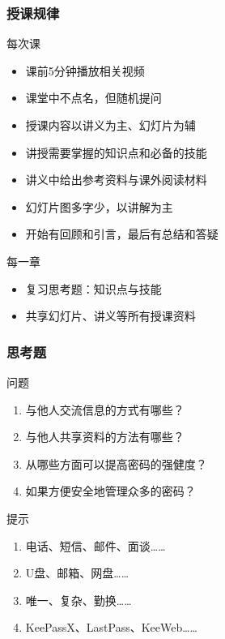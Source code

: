 \begin{frame}
  \frametitle{授课规律}
  \begin{block}{每次课}
    \begin{itemize}
      \item 课前5分钟播放相关视频
      \item 课堂中不点名，但随机提问
      \item 授课内容以讲义为主、幻灯片为辅
      \item 讲授需要掌握的知识点和必备的技能
      \item 讲义中给出参考资料与课外阅读材料
      \item 幻灯片图多字少，以讲解为主
      \item 开始有回顾和引言，最后有总结和答疑
    \end{itemize}
  \end{block}
  \pause
  \begin{block}{每一章}
    \begin{itemize}
      \item 复习思考题：知识点与技能
      \item 共享幻灯片、讲义等所有授课资料
    \end{itemize}
  \end{block}
\end{frame}

\begin{frame}
  \frametitle{思考题}
  \begin{block}{问题}
  \begin{enumerate}[<+-|alert@+>]
    \item 与他人交流信息的方式有哪些？
    \item 与他人共享资料的方法有哪些？
    \item 从哪些方面可以提高密码的强健度？
    \item 如果方便安全地管理众多的密码？
  \end{enumerate}
  \end{block}
  \pause
  \begin{block}{提示}
    \begin{enumerate}
      \item 电话、短信、邮件、面谈……
      \item U盘、邮箱、网盘……
      \item 唯一、复杂、勤换……
      \item KeePassX、LastPass、KeeWeb……
    \end{enumerate}
  \end{block}
\end{frame}

